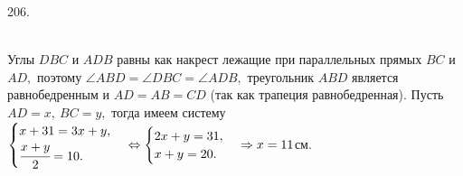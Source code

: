 206. \begin{figure}[ht!]
\end{figure}\\
Углы $DBC$ и $ADB$ равны как накрест лежащие при параллельных прямых $BC$ и $AD,$ поэтому $\angle ABD=\angle DBC=\angle ADB,$ треугольник $ABD$ является равнобедренным и $AD=AB=CD$ (так как трапеция равнобедренная). Пусть $AD=x,\ BC=y,$ тогда имеем систему\\ $\begin{cases} x+31=3x+y,\\ \cfrac{x+y}{2}=10. \end{cases}
\Leftrightarrow  \begin{cases} 2x+y=31,\\ x+y=20. \end{cases} \Rightarrow x=11$см.\\
